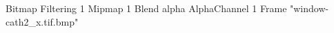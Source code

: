 {Bitmap
	{Filtering 1}
	{Mipmap 1}
	{Blend alpha}
	{AlphaChannel 1}
	{Frame "window-cath2_x.tif.bmp"}
}
